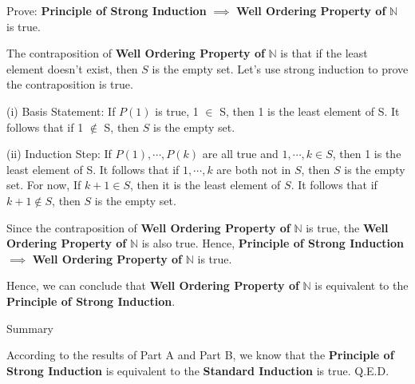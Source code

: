 \begin{flushleft}
Prove: \textbf{Principle of Strong Induction} $\implies$ \textbf{Well Ordering 
Property of} $\mathbb{N}$ is true. \\
\vspace{10px}

The contraposition of \textbf{Well Ordering Property of} $\mathbb{N}$ is that 
if the least element doesn't exist, then $S$ is the empty set. Let's use strong 
induction to prove the contraposition is true. \\
\vspace{10px}

(i) Basis Statement: 
If $P(1)$ is true, 1 $\in$ S, then 1 is the least element of S. It follows that 
if 1 $\notin$ S, then $S$ is the empty set. \\
\vspace{10px}

(ii) Induction Step: 
If $P(1), \cdots, P(k)$ are all true and $1, \cdots, k \in S$, then 1 is the 
least element of S. It follows that if $1, \cdots, k$ are both not in $S$, 
then $S$ is the empty set. For now, If $k + 1 \in S$, then it is the least 
element of $S$. It follows that if $k + 1 \notin S$, then $S$ is the 
empty set. \\
\vspace{10px}

Since the contraposition of \textbf{Well Ordering Property of} $\mathbb{N}$ is 
true, the \textbf{Well Ordering Property of} $\mathbb{N}$ is also true. Hence, 
\textbf{Principle of Strong Induction} $\implies$ \textbf{Well Ordering 
Property of} $\mathbb{N}$ is true.
\end{flushleft}

\begin{flushleft}
Hence, we can conclude that \textbf{Well Ordering Property of} $\mathbb{N}$ is 
equivalent to the \textbf{Principle of Strong Induction}. \\
\end{flushleft}

\begin{flushleft}
Summary \\
\vspace{10px}

According to the results of Part A and Part B, we know that the 
\textbf{Principle of Strong Induction} is equivalent to the \textbf{Standard 
Induction} is true. Q.E.D.
\end{flushleft}
